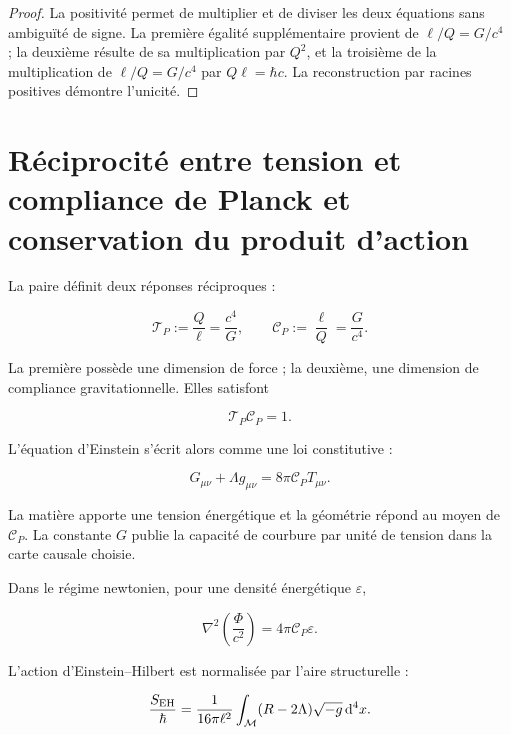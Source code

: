 \begin{proof}
La positivité permet de multiplier et de diviser les deux équations sans
ambiguïté de signe. La première égalité supplémentaire provient de
\(\ell/Q=G/c^4\) ; la deuxième résulte de sa multiplication par \(Q^2\), et la
troisième de la multiplication de \(\ell/Q=G/c^4\) par
\(Q\ell=\hbar c\). La reconstruction par racines positives démontre
l'unicité.
\end{proof}

\section{Réciprocité entre tension et compliance de Planck et conservation du produit d'action}

La paire définit deux réponses réciproques :

\begin{equation}
\mathscr T_P:=\frac{Q}{\ell}=\frac{c^4}{G},
\qquad
\mathscr C_P:=\frac{\ell}{Q}=\frac{G}{c^4}.
\label{eq:rm-tension-compliance}
\end{equation}

La première possède une dimension de force ; la deuxième, une dimension de
compliance gravitationnelle. Elles satisfont

\[
\mathscr T_P\mathscr C_P=1.
\]

L'équation d'Einstein s'écrit alors comme une loi constitutive :

\begin{equation}
\boxed{
G_{\mu\nu}+\Lambda g_{\mu\nu}
=8\pi\mathscr C_P T_{\mu\nu}.}
\label{eq:rm-einstein-compliance}
\end{equation}

La matière apporte une tension énergétique et la géométrie répond au moyen de
\(\mathscr C_P\). La constante \(G\) publie la capacité de courbure par
unité de tension dans la carte causale choisie.

Dans le régime newtonien, pour une densité énergétique
\(\varepsilon\),

\[
\nabla^2\!\left(\frac{\Phi}{c^2}\right)
=4\pi\mathscr C_P\varepsilon.
\]

L'action d'Einstein--Hilbert est normalisée par l'aire structurelle :

\begin{equation}
\frac{S_{\rm EH}}{\hbar}
=\frac{1}{16\pi\ell^2}
\int_{\mathcal M}(R-2\Lambda)\sqrt{-g}\,\mathrm d^4x.
\label{eq:rm-eh-area}
\end{equation}

